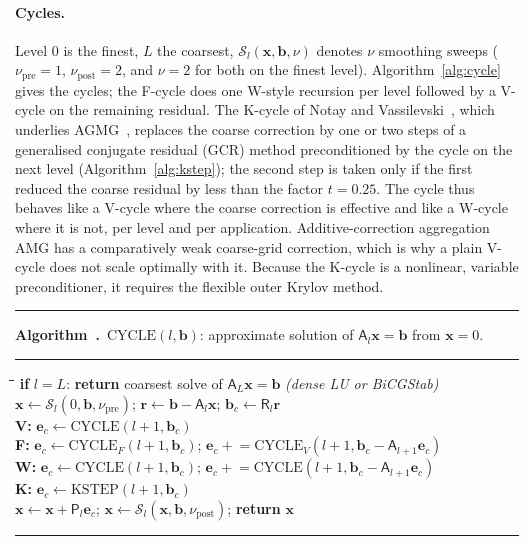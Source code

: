 \documentclass[11pt,a4paper]{article}
\newcounter{algorithm}
\newenvironment{algo}[2]{%
  \par\medskip\noindent
  \begin{minipage}{\linewidth}
  \refstepcounter{algorithm}\label{#2}%
  \hrule\smallskip\noindent\textbf{Algorithm~\thealgorithm.}\ #1\par
  \smallskip\hrule\smallskip\small
  \begin{tabbing}
  \hspace*{2em}\=\hspace*{2em}\=\hspace*{2em}\=\hspace*{2em}\=\kill}
  {\end{tabbing}\vspace*{-1ex}\hrule\end{minipage}\par\medskip}
\newcommand{\vect}[1]{\mathbf{#1}}
\begin{document}
\paragraph{Cycles.} Level $0$ is the finest, $L$ the coarsest,
$\mathcal S_l(\vect x,\vect b,\nu)$ denotes $\nu$ smoothing sweeps
($\nu_{\mathrm{pre}}=1$, $\nu_{\mathrm{post}}=2$, and $\nu=2$ for both on the
finest level). Algorithm~\ref{alg:cycle} gives the cycles; the F-cycle does
one W-style recursion per level followed by a V-cycle on the remaining
residual. The K-cycle of Notay and Vassilevski~\cite{NotayVassilevski2008},
which underlies AGMG~\cite{Notay2010}, replaces the coarse correction by one
or two steps of a generalised conjugate residual (GCR) method preconditioned
by the cycle on the next level (Algorithm~\ref{alg:kstep}); the second step
is taken only if the first reduced the coarse residual by less than the
factor $t=0.25$. The cycle thus behaves like a V-cycle where the coarse
correction is effective and like a W-cycle where it is not, per level and
per application. Additive-correction aggregation AMG has a comparatively
weak coarse-grid correction, which is why a plain V-cycle does not scale
optimally with it. Because the K-cycle is a nonlinear, variable
preconditioner, it requires the flexible outer Krylov method.

\begin{algo}{$\mathrm{CYCLE}(l,\vect b)$: approximate solution of
$\mathsf A_l\vect x=\vect b$ from $\vect x=0$.}{alg:cycle}
\textbf{if} $l=L$: \textbf{return} coarsest solve of $\mathsf A_L\vect x=\vect b$ \textit{(dense LU or BiCGStab)}\\
$\vect x\leftarrow\mathcal S_l(0,\vect b,\nu_{\mathrm{pre}})$; \quad $\vect r\leftarrow\vect b-\mathsf A_l\vect x$; \quad $\vect b_c\leftarrow\mathsf R_l\vect r$\\
\textbf{V:} \> $\vect e_c\leftarrow\mathrm{CYCLE}(l+1,\vect b_c)$\\
\textbf{F:} \> $\vect e_c\leftarrow\mathrm{CYCLE}_F(l+1,\vect b_c)$; \quad $\vect e_c\mathrel{+}=\mathrm{CYCLE}_V(l+1,\vect b_c-\mathsf A_{l+1}\vect e_c)$\\
\textbf{W:} \> $\vect e_c\leftarrow\mathrm{CYCLE}(l+1,\vect b_c)$; \quad $\vect e_c\mathrel{+}=\mathrm{CYCLE}(l+1,\vect b_c-\mathsf A_{l+1}\vect e_c)$\\
\textbf{K:} \> $\vect e_c\leftarrow\mathrm{KSTEP}(l+1,\vect b_c)$\\
$\vect x\leftarrow\vect x+\mathsf P_l\vect e_c$; \quad $\vect x\leftarrow\mathcal S_l(\vect x,\vect b,\nu_{\mathrm{post}})$; \quad \textbf{return} $\vect x$
\end{algo}
\end{document}
